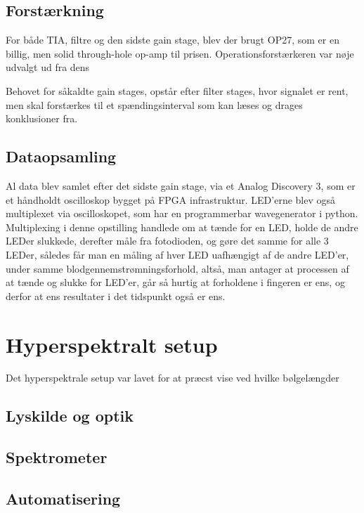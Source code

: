   \subsection{Forstærkning} 
For både TIA, filtre og den sidste gain stage, blev der brugt OP27, som er en billig, men solid through-hole op-amp til prisen. Operationsforstærkeren var nøje udvalgt ud fra dens

Behovet for såkaldte gain stages, opstår efter filter stages, hvor signalet er rent, men skal forstærkes til et spændingsinterval som kan læses og drages konklusioner fra.


  \subsection{Dataopsamling} %
Al data blev samlet efter det sidste gain stage, via et Analog Discovery 3, som er et håndholdt oscilloskop bygget på FPGA infrastruktur. LED'erne blev også multiplexet via oscilloskopet, som har en programmerbar wavegenerator i python. Multiplexing i denne opstilling handlede om at tænde for en LED, holde de andre LEDer slukkede, derefter måle fra fotodioden, og gøre det samme for alle 3 LEDer, således får man en måling af hver LED uafhængigt af de andre LED'er, under samme blodgennemstrømningsforhold, altså, man antager at processen af at tænde og slukke for LED'er, går så hurtig at forholdene i fingeren er ens, og derfor at ens resultater i det tidspunkt også er ens.


\section{Hyperspektralt setup}
Det hyperspektrale setup var lavet for at præcst vise ved hvilke bølgelængder 
  \subsection{Lyskilde og optik} %
  \subsection{Spektrometer} %
  \subsection{Automatisering} %